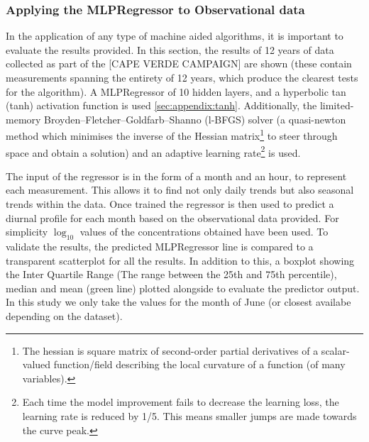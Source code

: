 \subsubsection{Applying the MLPRegressor to Observational data}
In the application of any type of machine aided algorithms, it is important to evaluate the results provided. In this section, the results of 12 years of data collected as part of the [CAPE VERDE CAMPAIGN] are shown (these contain measurements spanning the entirety of 12 years, which produce the clearest tests for the algorithm). A MLPRegressor of 10 hidden layers, and a hyperbolic tan (tanh) activation function is used \autoref{sec:appendix:tanh}. Additionally, the limited-memory Broyden–Fletcher–Goldfarb–Shanno (l-BFGS) solver (a quasi-newton method which minimises the inverse of the Hessian matrix\footnote{ The hessian is square matrix of second-order partial derivatives of a scalar-valued function/field describing the local curvature of a function (of many variables).} to steer through space and obtain a solution) and an adaptive learning rate\footnote{Each time the model improvement fails to decrease the learning loss, the learning rate is reduced by 1/5. This means smaller jumps are made towards the curve peak. } is used. 

The input of the regressor is in the form of a month and an hour, to represent each measurement. This allows it to find not only daily trends but also seasonal trends within the data. Once trained the regressor is then used to predict a diurnal profile for each month based on the observational data provided. For simplicity $\log_{10}$ values of the concentrations obtained have been used. To validate the results, the predicted MLPRegressor line is compared to a transparent scatterplot for all the results. In addition to this, a boxplot showing the Inter Quartile Range (The range between the 25th and 75th percentile), median and mean (green line) plotted alongside to evaluate the predictor output. In this study we only take the values for the month of June (or closest availabe depending on the dataset). 

